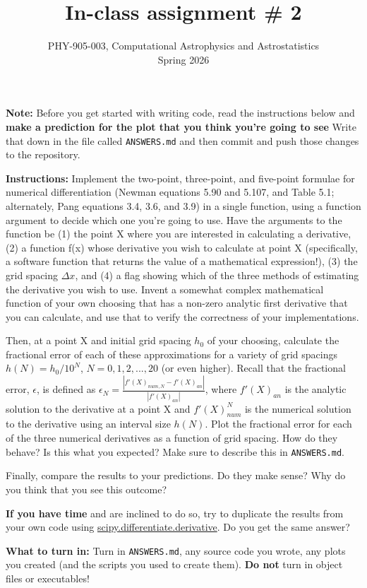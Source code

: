 \documentclass[10pt]{article}
\title{In-class assignment \# 2}
\author{PHY-905-003, Computational Astrophysics and
  Astrostatistics\\Spring 2026}
\date{} %
\begin{document}
 
\maketitle

\vspace{-5mm}

\noindent
\textbf{Note:} Before you get started with writing code, read the
instructions below and \textbf{make a prediction for the plot that you think
you're going to see}  Write that down in the file called
\texttt{ANSWERS.md} and then commit and push those changes to the repository.

\vspace{5mm}

\noindent 
\textbf{Instructions:} Implement the two-point, three-point,
and five-point formulae for numerical differentiation (Newman
equations 5.90 and
5.107, and Table 5.1; alternately, Pang equations
3.4, 3.6, and 3.9) in a single function, using a function argument to
decide which one you're going to use.  Have the arguments to the
function be (1) the point X where you are interested in calculating a
derivative,
 (2) a function f(x) whose derivative you wish to calculate
at point X (specifically, a software function that returns the value
of a mathematical expression!), 
(3) the grid spacing $\Delta x$, and (4) a flag showing which of
the three methods of estimating the derivative you wish to use.
Invent a somewhat complex mathematical function of your own choosing
that has a non-zero analytic first derivative that you can calculate, and use that to
verify the correctness of your implementations.

Then, at a point X and initial grid spacing $h_0$ of your choosing,
calculate the fractional error of each of these approximations for a
variety of grid spacings $h(N) = h_0 / 10^N$, $N=0, 1, 2, ..., 20$ (or
even higher).  Recall that the fractional error, $\epsilon$, is
defined as $\epsilon_N = \frac{|f'(X)_{num,N} -
f'(X)_{an}|}{|f'(X)_{an}|}$, where $f'(X)_{an}$ is the analytic
solution to the derivative at a point X and $f'(X)^N_{num}$ is the
numerical solution to the derivative using an interval size $h(N)$.
Plot the fractional error for each of the three numerical derivatives as a
function of grid spacing.  How do they behave?  Is this what you
expected?  Make sure to describe this in \texttt{ANSWERS.md}.

Finally, compare the results to your predictions.  Do they make sense?
Why do you think that you see this outcome?

\textbf{If you have time} and are inclined to do so, try to duplicate
the results from your own code using
\href{https://docs.scipy.org/doc/scipy-1.17.0/reference/generated/scipy.differentiate.derivative.html#scipy.differentiate.derivative}{scipy.differentiate.derivative}.
Do you get the same answer?

\vspace{5mm}

\noindent 
\textbf{What to turn in:} Turn in \texttt{ANSWERS.md}, any
source code you wrote, any plots you created (and the scripts you used
to create them).  \textbf{Do not} turn in object files or
executables!
\end{document}
